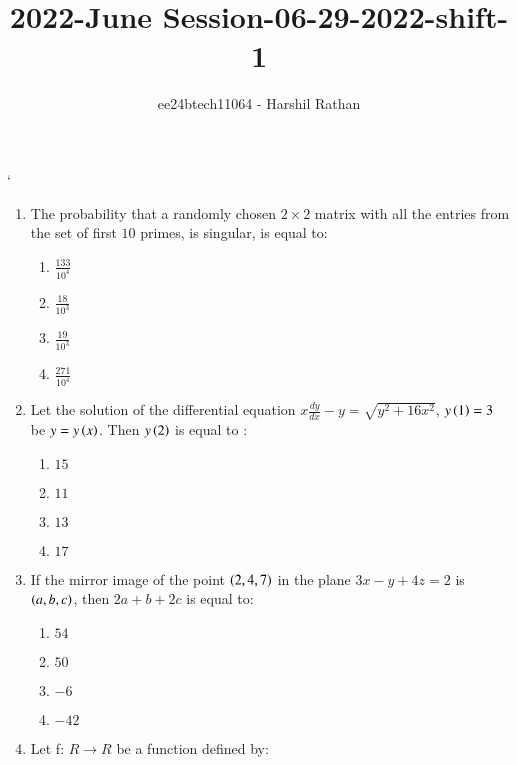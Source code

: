 \documentclass[journal,12pt,twocolumn]{IEEEtran}
\theoremstyle{remark}
\begin{document}

\vspace{3cm}

\title{2022-June Session-06-29-2022-shift-1}
\author{ee24btech11064 - Harshil Rathan}
\maketitle
\newpage
\bigskip

\renewcommand{\thefigure}{\theenumi}
`\renewcommand{\thetable}{\theenumi}
\begin{enumerate}
\item The probability that a randomly chosen $2\times 2$ matrix with all the entries from the set of first $10$ primes, is singular, is equal to:
\begin{multicols}{2}
\begin{enumerate}
    \item $\frac{133}{10^4}$
    \item $\frac{18}{10^3}$
    \item $\frac{19}{10^3}$
    \item $\frac{271}{10^4}$ 
\end{enumerate}
\end{multicols}
\bigskip
\item Let the solution of the differential equation $x\frac{dy}{dx}-y=\sqrt{y^2+16x^2}$, $y\left(1\right)=3$ be $y=y\left(x\right)$. Then $y\left(2\right)$ is equal to :
\begin{multicols}{2}
\begin{enumerate}
    \item $15$
    \item $11$
    \item $13$
    \item $17$
\end{enumerate}
\end{multicols}
\bigskip
\item If the mirror image of the point $\left(2,4,7\right)$ in the plane $3x-y+4z=2$ is $\left(a,b,c\right)$, then $2a+b+2c$ is equal to:
\begin{multicols}{2}
\begin{enumerate}
       \item $54$
       \item $50$
       \item $-6$
       \item $-42$
\end{enumerate}
\end{multicols}
\bigskip
\item Let f: $R\rightarrow R$ be a function defined by:

\end{enumerate}
\end{document}

